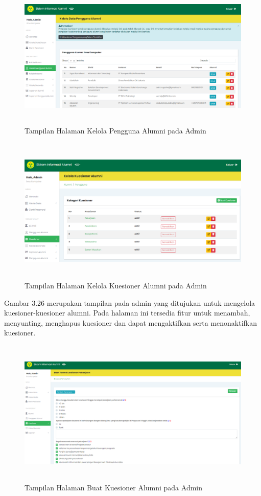 \begin{figure}[H]
	\centering
	\includegraphics[width=14cm,height=7cm]{gambar/tampilan/admin_kelolaPenggunaAlumni}
	\caption{Tampilan Halaman Kelola Pengguna Alumni pada Admin }
	\label{ui_adminKelolaPenggunaAlumni}
\end{figure}

\begin{figure}[H]
	\centering
	\includegraphics[width=14cm,height=7cm]{gambar/tampilan/admin_kelolaKuesioner}
	\caption{Tampilan Halaman Kelola Kuesioner Alumni pada Admin }
	\label{ui_adminkelolaKuesionerAlumni}
\end{figure}

Gambar 3.26 merupakan tampilan pada admin yang ditujukan untuk mengelola kuesioner-kuesioner alumni. Pada halaman ini tersedia fitur untuk menambah, menyunting, menghapus kuesioner dan dapat mengaktifkan serta menonaktifkan kuesioner. 

\begin{figure}[H]
	\centering
	\includegraphics[width=14cm,height=7cm]{gambar/tampilan/admin_buatKuesioner}
	\caption{Tampilan Halaman Buat Kuesioner Alumni pada Admin }
	\label{ui_adminBuatKuesionerAlumni}
\end{figure}

